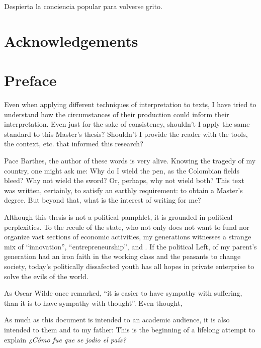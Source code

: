 \documentclass[paper=B6,portrait,twoside=true,twocolumn=false,headinclude=true,footinclude=false,fontsize=12,BCOR=10mm,DIV=calc,pagesize=auto,titlepage=firstiscover,mpinclude=false,headings=normal,headings=twolinechapter,open=right,toc=graduated,chapterprefix=false,numbers=endperiod,parskip=half+]{scrbook}
\theoremstyle{definition}
\begin{document}
\begin{spanish}
Despierta la conciencia popular para volverse grito.
\end{spanish}

\vspace*{\fill}

\newpage
\tableofcontents 

\frontmatter
\pagestyle{plain}
\chapter{Acknowledgements} 

\lipsum

\chapter{Preface} 

Even when applying different techniques of interpretation to texts, I have
tried to understand how the circumstances of their production could inform
their interpretation. Even just for the sake of consistency, shouldn't I
apply the same standard to this Master's thesis? Shouldn't I provide the
reader with the tools, the context, etc. that informed this research?

Pace Barthes, the author of these words is very alive. Knowing the tragedy
of my country, one might ask me: Why do I wield the pen, as the Colombian
fields bleed? Why not wield the sword? Or, perhaps, why not wield both?
This text was written, certainly, to satisfy an earthly requirement: to
obtain a Master's degree. But beyond that, what is the interest of writing
for me?

Although this thesis is not a political pamphlet, it is grounded in
political perplexities. To the recule of the state, who not only does not
want to fund nor organize vast sections of economic activities, my
generations witnesses a strange mix of ``innovation'',
``entrepreneurship'', and . If the political Left, of my parent's
generation had an iron faith in the working class and the peasants to
change society, today's politically dissafected youth has all hopes in
private enterprise to solve the evils of the world.

As Oscar Wilde once remarked, ``it is easier to have sympathy with
suffering, than it is to have sympathy with thought''. Even thought,

As much as this document is intended to an academic audience, it is also
intended to them and to my father: This is the beginning of a lifelong
attempt to explain \emph{¿Cómo fue que se jodio el país?} 
\end{document}
